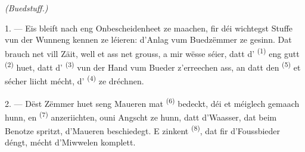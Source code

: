 \VUsaut{4.0mm}
{\centering\fontsize{10.2pt}{10.2pt}\selectfont{} \textit{(Buedstuff.)}\par}
\VUsaut{3.0mm}

1. --- Eis bleift nach eng Onbescheidenheet ze maachen, fir déi wichtegst Stuffe vun
der Wunneng kennen ze léieren: d'Anlag vum Buedzëmmer ze gesinn. Dat brauch net vill
Zäit, well et ass net grouss, a mir wësse séier, datt d'
\textsuperscript{(1)} eng gutt  \textsuperscript{(2)} huet, datt
d' \textsuperscript{(3)} vun der Hand vum Bueder z'erreechen ass,
an datt den  \textsuperscript{(5)} et sécher liicht mécht,
d' \textsuperscript{(4)} ze dréchnen.

2. --- Dëst Zëmmer huet seng Maueren mat  \textsuperscript{(6)}
bedeckt, déi et méiglech gemaach hunn, en 
\textsuperscript{(7)} anzeriichten, ouni Angscht ze hunn, datt d'Waasser, dat beim
Benotze spritzt, d'Maueren beschiedegt. E zinkent 
\textsuperscript{(8)}, dat fir d'Foussbieder déngt, mécht d'Miwwelen komplett.

\VUsaut{6.0mm}
\VUfilet{22mm}
